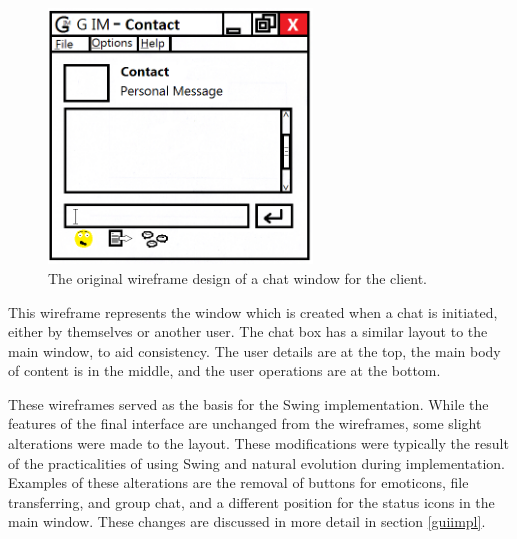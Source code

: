 \begin{figure}[!h]
    \begin{center}
        \includegraphics[width=7cm]{Design/diagrams/Chat_Box.png}
        \caption{The original wireframe design of a chat window for the client.}
        \label{chatBox}
    \end{center}
\end{figure}

This wireframe represents the window which is created when a chat is initiated, either by themselves or another user. The chat box has a similar layout to the main window, to aid consistency. The user details are at the top, the main body of content is in the middle, and the user operations are at the bottom.

These wireframes served as the basis for the Swing implementation. While the features of the final interface are unchanged from the wireframes, some slight alterations were made to the layout. These modifications were typically the result of the practicalities of using Swing and natural evolution during implementation. Examples of these alterations are the removal of buttons for emoticons, file transferring, and group chat, and a different position for the status icons in the main window. These changes are discussed in more detail in section \ref{guiimpl}.
